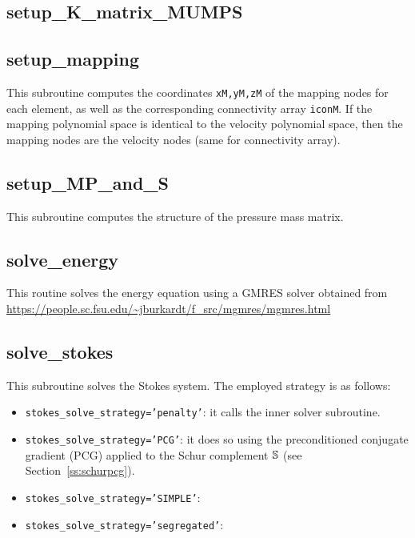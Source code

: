  \subsection{setup\_K\_matrix\_MUMPS}

 \subsection{setup\_mapping}
 This subroutine computes the coordinates {\tt xM,yM,zM} of the mapping nodes for each element, 
 as well as the corresponding connectivity array {\tt iconM}.
 If the mapping polynomial space is identical to the velocity polynomial space, then 
 the mapping nodes are the velocity nodes (same for connectivity array).
 \subsection{setup\_MP\_and\_S}
 This subroutine computes the structure of the pressure mass matrix. 
 \subsection{solve\_energy}
 This routine solves the energy equation using a GMRES solver obtained from 
 \url{https://people.sc.fsu.edu/~jburkardt/f_src/mgmres/mgmres.html} 
 \subsection{solve\_stokes}
 This subroutine solves the Stokes system. 
 The employed strategy is as follows:
 \begin{itemize}
 \item {\tt stokes\_solve\_strategy='penalty'}: it calls the inner solver subroutine. 
 \item {\tt stokes\_solve\_strategy='PCG'}:
 it does so using the preconditioned conjugate gradient (PCG) applied 
 to the Schur complement ${\mathbb{S}}$  (see Section~\ref{ss:schurpcg}).
 \item {\tt stokes\_solve\_strategy='SIMPLE'}:
 \item {\tt stokes\_solve\_strategy='segregated'}:
 \end{itemize}
